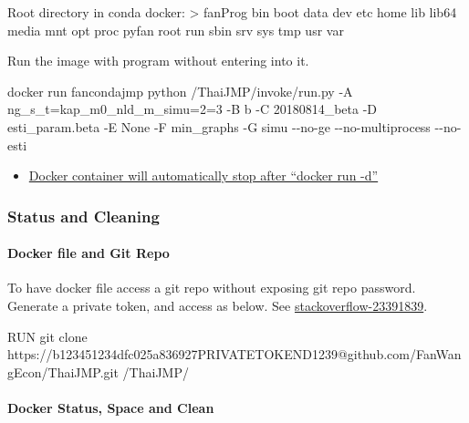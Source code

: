 \documentclass[
]{book}
\newenvironment{Shaded}{\begin{snugshade}}{\end{snugshade}}
\newcommand{\ExtensionTok}[1]{#1}
\newcommand{\NormalTok}[1]{#1}
\providecommand{\tightlist}{%
  \setlength{\itemsep}{0pt}\setlength{\parskip}{0pt}}
\begin{document}
Root directory in conda docker:
\textgreater{} fanProg bin boot data dev etc home lib lib64 media mnt opt proc pyfan root run sbin srv sys tmp usr var

Run the image with program without entering into it.

\begin{Shaded}
\begin{Highlighting}[]
\ExtensionTok{docker}\NormalTok{ run fancondajmp python /ThaiJMP/invoke/run.py {-}A ng\_s\_t=kap\_m0\_nld\_m\_simu=2=3 {-}B b {-}C 20180814\_beta {-}D esti\_param.beta {-}E None {-}F min\_graphs {-}G simu {-}{-}no{-}ge {-}{-}no{-}multiprocess {-}{-}no{-}esti}
\end{Highlighting}
\end{Shaded}

\begin{itemize}
\tightlist
\item
  \href{https://stackoverflow.com/questions/30209776/docker-container-will-automatically-stop-after-docker-run-d}{Docker container will automatically stop after ``docker run -d''}
\end{itemize}

\hypertarget{status-and-cleaning}{%
\subsubsection{Status and Cleaning}\label{status-and-cleaning}}

\hypertarget{docker-file-and-git-repo}{%
\paragraph{Docker file and Git Repo}\label{docker-file-and-git-repo}}

To have docker file access a git repo without exposing git repo password. Generate a private token, and access as below. See \href{https://stackoverflow.com/a/29464430/8280804}{stackoverflow-23391839}.

\begin{Shaded}
\begin{Highlighting}[]
\ExtensionTok{RUN}\NormalTok{ git clone https://b123451234dfc025a836927PRIVATETOKEND1239@github.com/FanWangEcon/ThaiJMP.git /ThaiJMP/}
\end{Highlighting}
\end{Shaded}

\hypertarget{docker-status-space-and-clean}{%
\paragraph{Docker Status, Space and Clean}\label{docker-status-space-and-clean}}
\end{document}
